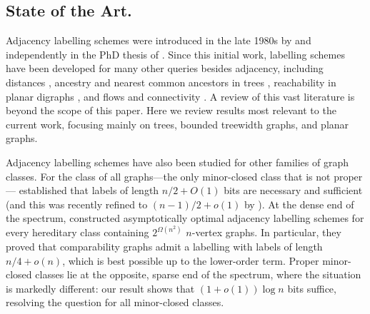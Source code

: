 \documentclass[twoside,leqno]{article}
\newcommand{\Oh}{O}
\begin{document}
\subsection{State of the Art.}
\label{ssec:state-of-art}

Adjacency labelling schemes were introduced in the late 1980s by \citet{kannan.naor.ea:implicit} and independently in the PhD thesis of \citet{muller:local}. Since this initial work, labelling schemes have been developed for many other queries besides adjacency, including distances \citep{GAVOILLE200485}, ancestry and nearest common ancestors in
trees \citep{AKM01,alstrup.rauhe:improved,DBLP:journals/mst/AlstrupGKR04}, reachability in planar
digraphs \citep{DBLP:journals/jacm/Thorup04,DBLP:conf/focs/HolmRT15}, and flows and connectivity \citep{DBLP:journals/siamcomp/KatzKKP04}. A review of this vast literature is beyond the scope of this paper. Here we review results most relevant to the current work, focusing mainly on trees, bounded treewidth graphs, and planar graphs.

Adjacency labelling schemes have also been studied for other families of graph classes. For the class of all graphs---the only minor-closed class that is not proper---\citet{AKTZ19} established that labels of length $n/2+\Oh(1)$ bits are necessary and sufficient (and this was recently refined to $(n-1)/2+o(1)$ by \citet{Alon24}). At the dense end of the spectrum, \citet{DBLP:conf/stoc/BonamyEGS21} constructed
asymptotically optimal adjacency labelling schemes for every hereditary class
containing $2^{\Omega(n^2)}$ $n$-vertex graphs. In particular, they proved that comparability graphs admit a labelling with labels of length $n/4+o(n)$, which is best possible up to the lower-order term. Proper minor-closed classes lie at the opposite, sparse end of the spectrum, where the situation is markedly different: our result shows that $(1+o(1))\log n$ bits suffice, resolving the question for all minor-closed classes.
\end{document}
